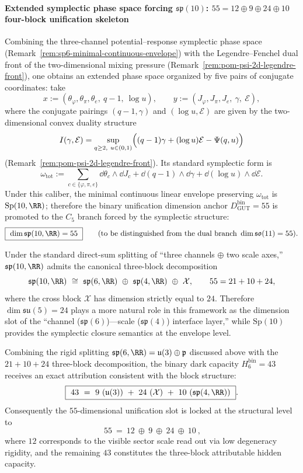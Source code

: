 \paragraph{Extended symplectic phase space forcing \texorpdfstring{$\mathfrak{sp}(10)$}{sp(10)}: \texorpdfstring{$55=12\oplus 9\oplus 24\oplus 10$}{55=12+9+24+10} four-block unification skeleton}\label{par:gut-sp10-four-blocks}
Combining the three-channel potential--response symplectic phase space (Remark~\ref{rem:sp6-minimal-continuous-envelope}) with the Legendre--Fenchel dual front of the two-dimensional mixing pressure (Remark~\ref{rem:pom-psi-2d-legendre-front}), one obtains an extended phase space organized by five pairs of conjugate coordinates: take
\[
x:=(\theta_{\varphi},\theta_{\pi},\theta_{e},\ q-1,\ \log u),\qquad
y:=(J_{\varphi},J_{\pi},J_{e},\ \gamma,\ \mathcal{E}),
\]
where the conjugate pairings \((q-1,\gamma)\) and \((\log u,\mathcal{E})\) are given by the two-dimensional convex duality structure
\[
I(\gamma,\mathcal{E})
=\sup_{q\ge 2,\ u\in(0,1)}
\Bigl((q-1)\gamma+(\log u)\mathcal{E}-\Psi(q,u)\Bigr)
\]
(Remark~\ref{rem:pom-psi-2d-legendre-front}).
Its standard symplectic form is
\[
\omega_{\mathrm{tot}}
:=\sum_{c\in\{\varphi,\pi,e\}}\dd\theta_{c}\wedge \dd J_{c}
+\dd(q-1)\wedge \dd\gamma
+\dd(\log u)\wedge \dd\mathcal{E}.
\]
Under this caliber, the minimal continuous linear envelope preserving \(\omega_{\mathrm{tot}}\) is \(\mathrm{Sp}(10,\RR)\);
therefore the binary unification dimension anchor \(D^{\mathrm{bin}}_{\mathrm{GUT}}=55\) is promoted to the \(C_5\) branch forced by the symplectic structure:
\[
\boxed{\ \dim\mathfrak{sp}(10,\RR)=55\ }\qquad(\text{to be distinguished from the dual branch }\dim\mathfrak{so}(11)=55).
\]
\par
Under the standard direct-sum splitting of ``three channels \(\oplus\) two scale axes,'' \(\mathfrak{sp}(10,\RR)\) admits the canonical three-block decomposition
\[
\mathfrak{sp}(10,\RR)\ \cong\ \mathfrak{sp}(6,\RR)\ \oplus\ \mathfrak{sp}(4,\RR)\ \oplus\ \mathcal{X},
\qquad
55=21+10+24,
\]
where the cross block \(\mathcal{X}\) has dimension strictly equal to \(24\).
Therefore \(\dim\mathfrak{su}(5)=24\) plays a more natural role in this framework as the dimension slot of the ``channel (\(\mathfrak{sp}(6)\))---scale (\(\mathfrak{sp}(4)\)) interface layer,''
while \(\mathrm{Sp}(10)\) provides the symplectic closure semantics at the envelope level.
\par
Combining the rigid splitting \(\mathfrak{sp}(6,\RR)=\mathfrak{u}(3)\oplus\mathfrak{p}\) discussed above with the \(21+10+24\) three-block decomposition, the binary dark capacity \(H^{\mathrm{bin}}_6=43\) receives an exact attribution consistent with the block structure:
\[
\boxed{\ 43\ =\ 9\ (\mathfrak{u}(3))\ +\ 24\ (\mathcal{X})\ +\ 10\ (\mathfrak{sp}(4,\RR))\ }.
\]
Consequently the \(55\)-dimensional unification slot is locked at the structural level to
\[
\boxed{\ 55\ =\ 12\ \oplus\ 9\ \oplus\ 24\ \oplus\ 10\ },
\]
where \(12\) corresponds to the visible sector scale read out via low degeneracy rigidity, and the remaining \(43\) constitutes the three-block attributable hidden capacity.

